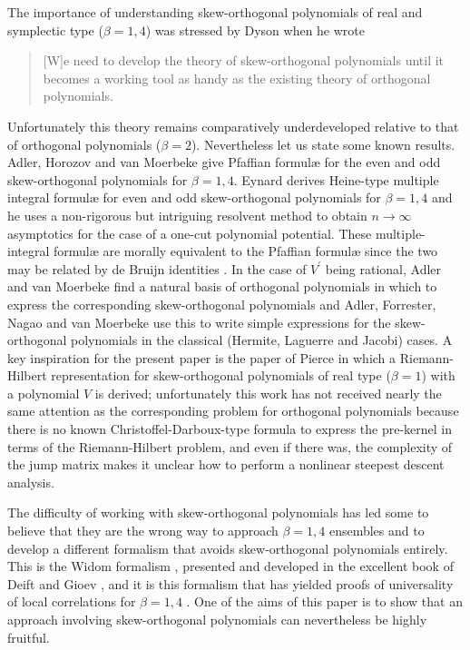 \documentclass[12pt]{article}
\theoremstyle{definition}
\begin{document}
The importance of understanding skew-orthogonal polynomials of real and symplectic type ($\beta = 1,4$) was stressed by Dyson \cite{Dyson} when he wrote
\begin{quote}
[W]e need to develop the theory of skew-orthogonal polynomials until it becomes a working tool as handy as the existing theory of orthogonal polynomials.
\end{quote}
Unfortunately this theory remains comparatively underdeveloped relative to that of orthogonal polynomials ($\beta =2$). Nevertheless let us state some known results.  Adler, Horozov and van Moerbeke \cite{Adler1999ThePL} give Pfaffian formulæ for the even and odd skew-orthogonal polynomials for $\beta=1,4$. Eynard \cite{Eynard:2001aa} derives Heine-type multiple integral formulæ for even and odd skew-orthogonal polynomials for $\beta =1,4$ and he uses a non-rigorous but intriguing resolvent method to obtain $n \to \infty$ asymptotics for the case of a one-cut polynomial potential.  These multiple-integral formulæ are morally equivalent to the Pfaffian formulæ since the two may be related by de Bruijn identities \cite{debruijn}. In the case of $V^\prime$ being rational, Adler and van Moerbeke \cite{adler1999pfaff} find a natural basis of orthogonal polynomials in which to express the corresponding skew-orthogonal polynomials and Adler, Forrester, Nagao and van Moerbeke \cite{Adler:2000aa} use this to write simple expressions for the skew-orthogonal polynomials in the classical (Hermite, Laguerre and Jacobi) cases. A key inspiration for the present paper is the paper of Pierce \cite{PIERCE2008230} in which a Riemann-Hilbert representation for skew-orthogonal polynomials of real type ($\beta = 1$) with a polynomial $V$ is derived; unfortunately  this work has not received nearly the same attention as the corresponding problem for orthogonal polynomials because there is no known Christoffel-Darboux-type formula to express the pre-kernel in terms of the Riemann-Hilbert problem, and even if there was, the complexity of the jump matrix makes it unclear how to perform a nonlinear steepest descent analysis.

The difficulty of working with skew-orthogonal polynomials has led some to believe that they are the wrong way to approach $\beta = 1,4$ ensembles and to develop a different formalism that avoids skew-orthogonal polynomials entirely. This is the Widom formalism \cite{Widom:1999aa}, presented and developed in the excellent book of Deift and Gioev \cite{deiftuniversality}, and it is this formalism that has yielded proofs of universality of local correlations for $\beta=1,4$ \cite{Stojanovic:2000aa,Deift:2007aa,Shcherbina:2009aa,Shcherbina:2009ab,kriecherbauer2010fluctuations,Shcherbina:2011aa}. One of the aims of this paper is to show that an approach involving skew-orthogonal polynomials can nevertheless be highly fruitful.
\end{document}
